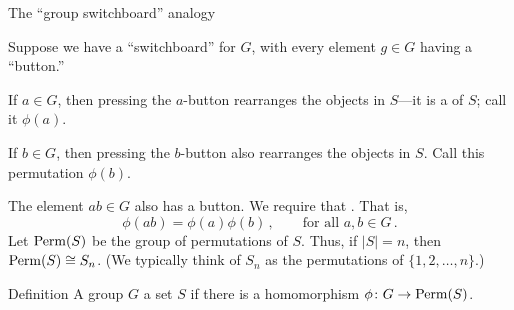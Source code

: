 \documentclass[8pt, handout]{beamer}
\newcommand{\Pause}{}      %
\begin{document}

\begin{frame}{The ``group switchboard'' analogy} %

  Suppose we have a ``switchboard'' for $G$, with every element $g\in
  G$ having a ``button.''

  \bigskip\Pause 

  If $a\in G$, then pressing the $a$-button rearranges the
  objects in $S$---it is a 
  of $S$; call it $\phi(a)$.

  \bigskip\Pause 

  If $b\in G$, then pressing the $b$-button also rearranges the objects in
  $S$. Call this permutation $\phi(b)$.

  \bigskip\Pause 

  The element $ab\in G$ also has a button. We require that
  . \Pause That
  is,
  \[
  \phi(ab)=\phi(a)\phi(b)\,,\qquad\text{for all } a,b\in G\,.
  \]
  \Pause Let $\operatorname{Perm}(S)$ be the group of permutations of $S$. Thus, if
  $|S|=n$, then $\operatorname{Perm}(S)\cong S_n$. (We typically think of
  $S_n$ as the permutations of $\{1,2,\dots,n\}$.)
  
  \medskip\Pause 
  
  \begin{block}{Definition}
    A group $G$  a set $S$ if there is a homomorphism
    $\phi\colon G\to\operatorname{Perm}(S)$.
  \end{block}

\end{frame}

\end{document}
